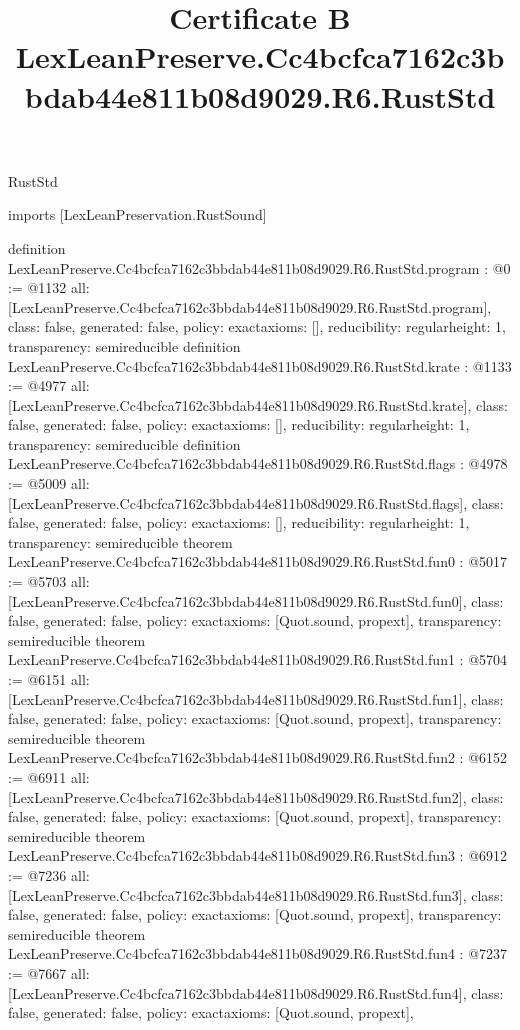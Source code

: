 \begin{lexlean}{RustStd}
\title{Certificate B LexLeanPreserve.Cc4bcfca7162c3bbdab44e811b08d9029.R6.RustStd}
\begin{coremodule}
imports [LexLeanPreservation.RustSound]

definition LexLeanPreserve.Cc4bcfca7162c3bbdab44e811b08d9029.R6.RustStd.program : @0 := @1132 {
  all: [LexLeanPreserve.Cc4bcfca7162c3bbdab44e811b08d9029.R6.RustStd.program],
  class: false,
  generated: false,
  policy: exact{axioms: []},
  reducibility: regular{height: 1},
  transparency: semireducible
}
definition LexLeanPreserve.Cc4bcfca7162c3bbdab44e811b08d9029.R6.RustStd.krate : @1133 := @4977 {
  all: [LexLeanPreserve.Cc4bcfca7162c3bbdab44e811b08d9029.R6.RustStd.krate],
  class: false,
  generated: false,
  policy: exact{axioms: []},
  reducibility: regular{height: 1},
  transparency: semireducible
}
definition LexLeanPreserve.Cc4bcfca7162c3bbdab44e811b08d9029.R6.RustStd.flags : @4978 := @5009 {
  all: [LexLeanPreserve.Cc4bcfca7162c3bbdab44e811b08d9029.R6.RustStd.flags],
  class: false,
  generated: false,
  policy: exact{axioms: []},
  reducibility: regular{height: 1},
  transparency: semireducible
}
theorem LexLeanPreserve.Cc4bcfca7162c3bbdab44e811b08d9029.R6.RustStd.fun0 : @5017 := @5703 {
  all: [LexLeanPreserve.Cc4bcfca7162c3bbdab44e811b08d9029.R6.RustStd.fun0],
  class: false,
  generated: false,
  policy: exact{axioms: [Quot.sound, propext]},
  transparency: semireducible
}
theorem LexLeanPreserve.Cc4bcfca7162c3bbdab44e811b08d9029.R6.RustStd.fun1 : @5704 := @6151 {
  all: [LexLeanPreserve.Cc4bcfca7162c3bbdab44e811b08d9029.R6.RustStd.fun1],
  class: false,
  generated: false,
  policy: exact{axioms: [Quot.sound, propext]},
  transparency: semireducible
}
theorem LexLeanPreserve.Cc4bcfca7162c3bbdab44e811b08d9029.R6.RustStd.fun2 : @6152 := @6911 {
  all: [LexLeanPreserve.Cc4bcfca7162c3bbdab44e811b08d9029.R6.RustStd.fun2],
  class: false,
  generated: false,
  policy: exact{axioms: [Quot.sound, propext]},
  transparency: semireducible
}
theorem LexLeanPreserve.Cc4bcfca7162c3bbdab44e811b08d9029.R6.RustStd.fun3 : @6912 := @7236 {
  all: [LexLeanPreserve.Cc4bcfca7162c3bbdab44e811b08d9029.R6.RustStd.fun3],
  class: false,
  generated: false,
  policy: exact{axioms: [Quot.sound, propext]},
  transparency: semireducible
}
theorem LexLeanPreserve.Cc4bcfca7162c3bbdab44e811b08d9029.R6.RustStd.fun4 : @7237 := @7667 {
  all: [LexLeanPreserve.Cc4bcfca7162c3bbdab44e811b08d9029.R6.RustStd.fun4],
  class: false,
  generated: false,
  policy: exact{axioms: [Quot.sound, propext]},
}
\end{coremodule}
\end{lexlean}
